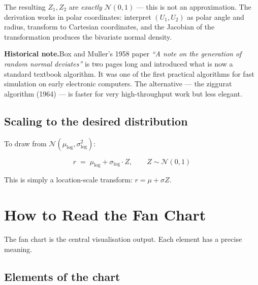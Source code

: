 \documentclass[11pt, a4paper]{article}
\newcommand{\N}{\mathcal{N}}
\begin{document}
The resulting $Z_1, Z_2$ are \emph{exactly} $\N(0,1)$ — this is not an approximation. The derivation works in polar coordinates: interpret $(U_1, U_2)$ as polar angle and radius, transform to Cartesian coordinates, and the Jacobian of the transformation produces the bivariate normal density.

\begin{tcolorbox}[infobox]
\textbf{Historical note.}\quad Box and Muller's 1958 paper \emph{``A note on the generation of random normal deviates''} is two pages long and introduced what is now a standard textbook algorithm. It was one of the first practical algorithms for fast simulation on early electronic computers. The alternative — the ziggurat algorithm (1964) — is faster for very high-throughput work but less elegant.
\end{tcolorbox}

\subsection*{Scaling to the desired distribution}

To draw from $\N(\mu_{\log}, \sigma^2_{\log})$:

\[
  r \;=\; \mu_{\log} + \sigma_{\log} \cdot Z, \qquad Z \sim \N(0,1)
\]

This is simply a location-scale transform: $r = \mu + \sigma Z$.

\section{How to Read the Fan Chart}
\label{sec:fanchart}

The fan chart is the central visualisation output. Each element has a precise meaning.

\subsection*{Elements of the chart}
\end{document}
